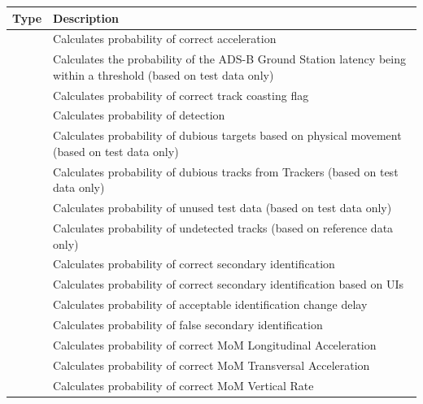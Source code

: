 \begin{center}
 \begin{table}[H]
  \begin{tabularx}{\textwidth}{ | l | X |  }
    \hline
    \textbf{Type} & \textbf{Description} \\ \hline
    \nameref{sec:eval_req_accel_correct} & Calculates probability of correct acceleration \\ \hline
    \nameref{sec:eval_req_adsb_latency} & Calculates the probability of the ADS-B Ground Station latency being within a threshold (based on test data only) \\ \hline
    \nameref{sec:eval_req_trk_coast_correct} & Calculates probability of correct track coasting flag \\ \hline
    \nameref{sec:eval_req_detection} & Calculates probability of detection  \\ \hline
    \nameref{sec:eval_req_dubious_targets} & Calculates probability of dubious targets based on physical movement (based on test data only) \\ \hline
    \nameref{sec:eval_req_dubious_tracks} & Calculates probability of dubious tracks from Trackers (based on test data only) \\ \hline
    \nameref{sec:eval_req_extra_data} & Calculates probability of unused test data (based on test data only) \\ \hline
    \nameref{sec:eval_req_extra_track} & Calculates probability of undetected tracks (based on reference data only) \\ \hline
    \nameref{sec:eval_req_id_correct} & Calculates probability of correct secondary identification \\ \hline
    \nameref{sec:eval_req_id_correct_periods} & Calculates probability of correct secondary identification based on UIs \\ \hline
    \nameref{sec:eval_req_id_change_delay} & Calculates probability of acceptable identification change delay \\ \hline
    \nameref{sec:eval_req_id_false} & Calculates probability of false secondary identification \\ \hline
    \nameref{sec:eval_req_mom_long} & Calculates probability of correct MoM Longitudinal Acceleration \\ \hline
    \nameref{sec:eval_req_mom_trans} & Calculates probability of correct MoM Transversal Acceleration \\ \hline
    \nameref{sec:eval_req_mom_vert} & Calculates probability of correct MoM Vertical Rate \\ \hline

\end{tabularx}
\end{table}
\end{center}
